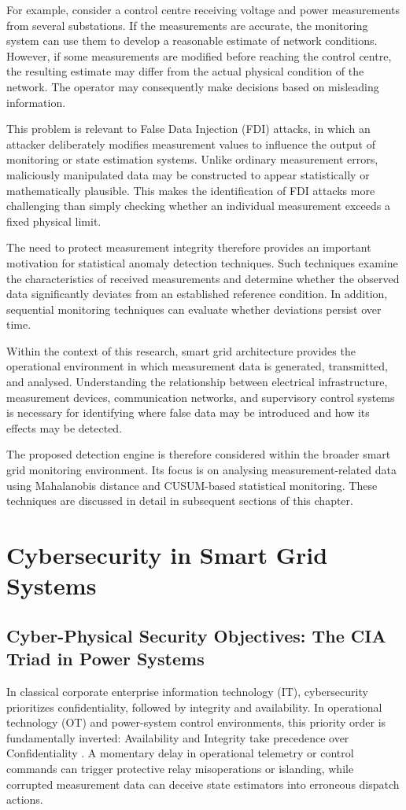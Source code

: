 \documentclass[12pt,a4paper]{report}
\begin{document}
For example, consider a control centre receiving voltage and power measurements from several
substations. If the measurements are accurate, the monitoring system can use them to develop
a reasonable estimate of network conditions. However, if some measurements are modified before
reaching the control centre, the resulting estimate may differ from the actual physical condition
of the network. The operator may consequently make decisions based on misleading information.

This problem is relevant to False Data Injection (FDI) attacks, in which an attacker deliberately
modifies measurement values to influence the output of monitoring or state estimation systems.
Unlike ordinary measurement errors, maliciously manipulated data may be constructed to appear
statistically or mathematically plausible. This makes the identification of FDI attacks more
challenging than simply checking whether an individual measurement exceeds a fixed physical limit.

The need to protect measurement integrity therefore provides an important motivation for
statistical anomaly detection techniques. Such techniques examine the characteristics of
received measurements and determine whether the observed data significantly deviates from an
established reference condition. In addition, sequential monitoring techniques can evaluate
whether deviations persist over time.

Within the context of this research, smart grid architecture provides the operational
environment in which measurement data is generated, transmitted, and analysed. Understanding
the relationship between electrical infrastructure, measurement devices, communication
networks, and supervisory control systems is necessary for identifying where false data
may be introduced and how its effects may be detected.

The proposed detection engine is therefore considered within the broader smart grid monitoring
environment. Its focus is on analysing measurement-related data using Mahalanobis distance
and CUSUM-based statistical monitoring. These techniques are discussed in detail in subsequent
sections of this chapter.

\section{Cybersecurity in Smart Grid Systems}

\subsection{Cyber-Physical Security Objectives: The CIA Triad in Power Systems}
In classical corporate enterprise information technology (IT), cybersecurity prioritizes
confidentiality, followed by integrity and availability. In operational technology (OT)
and power-system control environments, this priority order is fundamentally inverted:
Availability and Integrity take precedence over Confidentiality \cite{nist80082}.
A momentary delay in operational telemetry or control commands can trigger protective
relay misoperations or islanding, while corrupted measurement data can deceive state
estimators into erroneous dispatch actions.
\end{document}
